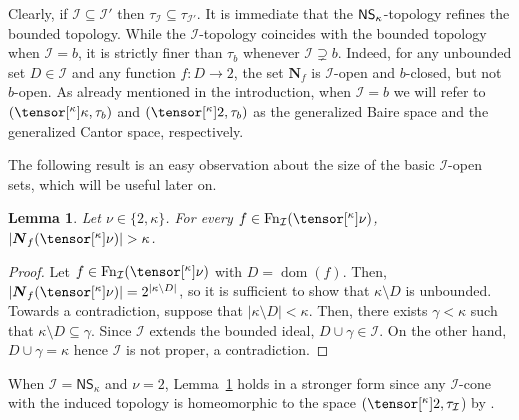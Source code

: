 \documentclass{amsart}
\numberwithin{equation}{section}
\newcommand{\I}{\mathcal{I}}
\newcommand{\pre}[2]{\tensor[^{#1}]{#2}{}}
\newcommand{\Nbhd}{\boldsymbol{N}}
\newcommand{\1}{\mathbf{I}}
\newcommand{\2}{\mathbf{II}}
\newcommand{\g}{\gamma}
\renewcommand{\k}{\kappa}
\DeclareMathOperator{\dom}{dom}
\DeclareMathOperator{\Fn}{Fn}
\newcommand{\clopen}[1]{\Nbhd_{#1}}
\newtheorem{lemma}[theorem]{Lemma}
\theoremstyle{definition}
\theoremstyle{remark}
\begin{document}
Clearly, if \(\I \subseteq \I'\) then \( \tau_\I \subseteq \tau_{\I'}\).  It is immediate that the \(\sf{NS_\k}\)-topology refines the bounded topology. While the \(\I\)-topology coincides with the bounded topology when \(\I=b\), it is strictly finer than \(\tau_{b}\) whenever \(\I \supsetneq b\). Indeed, for any unbounded set \(D\in\I\) and any function \(f:D \to 2\), the set \(\clopen{f}\) is \(\I\)-open and \({b}\)-closed, but not \({b}\)-open. As already mentioned in the introduction, when \(\I=b\) we will refer to $(\pre{\k}{\k}, \tau_b)$ and $(\pre{\k}{2}, \tau_b)$ as the generalized Baire space and the generalized Cantor space, respectively. 
  
The following result is an easy observation about the size of the basic \(\I\)-open sets, which will be useful later on.
\begin{lemma}\label{size_open}
 Let \(\nu \in \{2,\k\}\).  For every \(f \in \Fn_{\I}(\pre{\k}{\nu})\),  \(|\clopen{f}(\pre{\k}{\nu})|>\k\). 
\end{lemma}
\begin{proof}
    Let \(f \in \Fn_\I(\pre{\k}{\nu})\) with \(D=\dom(f)\). Then, \(|\clopen{f}(\pre{\k}{\nu})|=2^{|\kappa\setminus D|}\), so it is sufficient to show that \(\kappa \setminus D\) is unbounded. 
    Towards a contradiction, suppose that %
    \(|\kappa\setminus D|<\kappa\). Then, there exists \(\g<\k\) such that \(\kappa\setminus D \subseteq \g\). Since \(\I\) extends the bounded ideal, \(D \cup \g \in \I \). On the other hand, \(D \cup \g=\k\) hence \(\I\) is not proper, a contradiction.  
\end{proof}
When \(\I=\mathsf{NS}_\k\) and \(\nu=2\), Lemma~\ref{size_open} holds in a stronger form since any \(\I\)-cone with the induced topology is homeomorphic to the space \((\pre{\k}{2}, \tau_{\I}\)) by \cite[Lemma 1.6]{HKSW22}.
\end{document}
